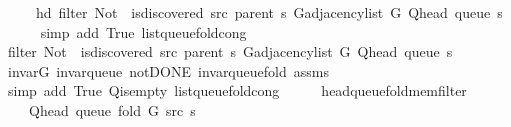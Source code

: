 \begin{isabellebody}
\ \ \ \ \ hd\ {\isacharparenleft}{\kern0pt}filter\ {\isacharparenleft}{\kern0pt}Not\ {\isasymcirc}\ is{\isacharunderscore}{\kern0pt}discovered\ src\ {\isacharparenleft}{\kern0pt}parent\ s{\isacharparenright}{\kern0pt}{\isacharparenright}{\kern0pt}\ {\isacharparenleft}{\kern0pt}G{\isachardot}{\kern0pt}adjacency{\isacharunderscore}{\kern0pt}list\ G\ {\isacharparenleft}{\kern0pt}Q{\isacharunderscore}{\kern0pt}head\ {\isacharparenleft}{\kern0pt}queue\ s{\isacharparenright}{\kern0pt}{\isacharparenright}{\kern0pt}{\isacharparenright}{\kern0pt}{\isacharparenright}{\kern0pt}{\isachardoublequoteclose}\isanewline
\ \ \ \ \isamarkupfalse%
\ {\isacharparenleft}{\kern0pt}simp\ add{\isacharcolon}{\kern0pt}\ True\ list{\isacharunderscore}{\kern0pt}queue{\isacharunderscore}{\kern0pt}fold{\isacharunderscore}{\kern0pt}cong{\isacharparenright}{\kern0pt}\isanewline
\ \ \isamarkupfalse%
\ \isamarkupfalse%
\ {\isachardoublequoteopen}filter\ {\isacharparenleft}{\kern0pt}Not\ {\isasymcirc}\ is{\isacharunderscore}{\kern0pt}discovered\ src\ {\isacharparenleft}{\kern0pt}parent\ s{\isacharparenright}{\kern0pt}{\isacharparenright}{\kern0pt}\ {\isacharparenleft}{\kern0pt}G{\isachardot}{\kern0pt}adjacency{\isacharunderscore}{\kern0pt}list\ G\ {\isacharparenleft}{\kern0pt}Q{\isacharunderscore}{\kern0pt}head\ {\isacharparenleft}{\kern0pt}queue\ s{\isacharparenright}{\kern0pt}{\isacharparenright}{\kern0pt}{\isacharparenright}{\kern0pt}\ {\isasymnoteq}\ {\isacharbrackleft}{\kern0pt}{\isacharbrackright}{\kern0pt}{\isachardoublequoteclose}\isanewline
\ \ \ \ \isamarkupfalse%
\ invar{\isacharunderscore}{\kern0pt}G\ invar{\isacharunderscore}{\kern0pt}queue\ not{\isacharunderscore}{\kern0pt}DONE\ invar{\isacharunderscore}{\kern0pt}queue{\isacharunderscore}{\kern0pt}fold{\isacharunderscore}{\kern0pt}{}\ assms\isanewline
\ \ \ \ \isamarkupfalse%
\ {\isacharparenleft}{\kern0pt}simp\ add{\isacharcolon}{\kern0pt}\ True\ Q{\isachardot}{\kern0pt}is{\isacharunderscore}{\kern0pt}empty\ list{\isacharunderscore}{\kern0pt}queue{\isacharunderscore}{\kern0pt}fold{\isacharunderscore}{\kern0pt}cong{\isacharparenright}{\kern0pt}\isanewline
\ \ \isamarkupfalse%
\ \isamarkupfalse%
\ head{\isacharunderscore}{\kern0pt}queue{\isacharunderscore}{\kern0pt}fold{\isacharunderscore}{\kern0pt}mem{\isacharunderscore}{\kern0pt}filter{\isacharcolon}{\kern0pt}\isanewline
\ \ \ \ {\isachardoublequoteopen}Q{\isacharunderscore}{\kern0pt}head\ {\isacharparenleft}{\kern0pt}queue\ {\isacharparenleft}{\kern0pt}fold\ G\ src\ s{\isacharparenright}{\kern0pt}{\isacharparenright}{\kern0pt}\ {\isasymin}\isanewline

\end{isabellebody}
